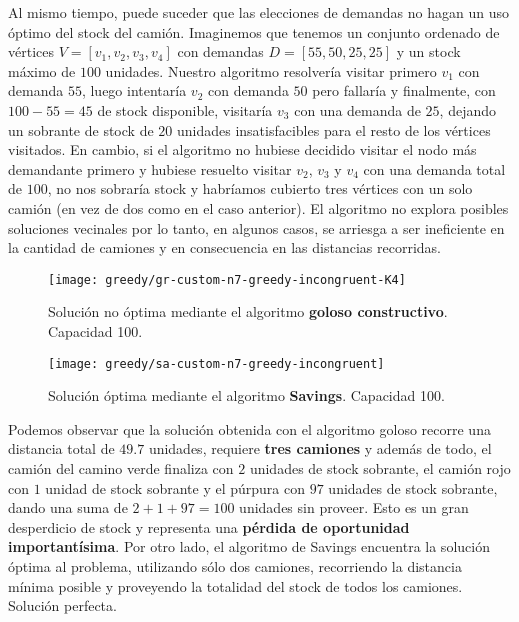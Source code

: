 Al mismo tiempo, puede suceder que las elecciones de demandas no hagan un uso óptimo del stock del camión. Imaginemos que tenemos un conjunto ordenado de vértices $V=[v_{1}, v_{2}, v_{3}, v_{4}]$ con demandas $D=[55, 50, 25, 25]$ y un stock máximo de $100$ unidades. Nuestro algoritmo resolvería visitar primero $v_{1}$ con demanda $55$, luego intentaría $v_{2}$ con demanda $50$ pero fallaría y finalmente, con $100 - 55 = 45$ de stock disponible, visitaría $v_{3}$ con una demanda de $25$, dejando un sobrante de stock de $20$ unidades insatisfacibles para el resto de los vértices visitados. En cambio, si el algoritmo no hubiese decidido visitar el nodo más demandante primero y hubiese resuelto visitar $v_{2}$, $v_{3}$ y $v_{4}$ con una demanda total de $100$, no nos sobraría stock y habríamos cubierto tres vértices con un solo camión (en vez de dos como en el caso anterior). El algoritmo no explora posibles soluciones vecinales por lo tanto, en algunos casos, se arriesga a ser ineficiente en la cantidad de camiones y en consecuencia en las distancias recorridas.

\begin{figure}[H]
	\centering
	\begin{minipage}{0.48\textwidth}
		\centering
		\texttt{[image: greedy/gr-custom-n7-greedy-incongruent-K4]}
		\caption{\footnotesize Solución no óptima mediante el algoritmo \textbf{goloso constructivo}. Capacidad 100.}
		\label{fig:gr-custom-n7-greedy-incongruent-K4}
	\end{minipage}%
	\hspace{0.03\textwidth}
	\begin{minipage}{0.48\textwidth}
		\centering
		\texttt{[image: greedy/sa-custom-n7-greedy-incongruent]}
		\caption{\footnotesize Solución óptima mediante el algoritmo \textbf{Savings}. Capacidad 100.}
		\label{fig:sa-custom-n7-greedy-incongruent}
	\end{minipage}%
\end{figure}

Podemos observar que la solución obtenida con el algoritmo goloso recorre una distancia total de $49.7$ unidades, requiere \textbf{tres camiones} y además de todo, el camión del camino verde finaliza con $2$ unidades de stock sobrante, el camión rojo con $1$ unidad de stock sobrante y el púrpura con $97$ unidades de stock sobrante, dando una suma de $2+1+97=100$ unidades sin proveer. Esto es un gran desperdicio de stock y representa una \textbf{pérdida de oportunidad importantísima}. Por otro lado, el algoritmo de Savings encuentra la solución óptima al problema, utilizando sólo dos camiones, recorriendo la distancia mínima posible y proveyendo la totalidad del stock de todos los camiones. Solución perfecta.

